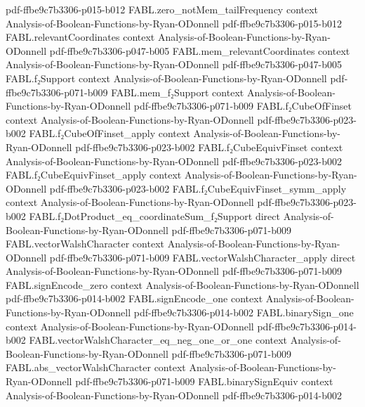 \begin{theorem}
  {pdf-ffbe9c7b3306-p015-b012}
\proofstep
  {FABL.zero_notMem_tailFrequency}
  {context}
  {Analysis-of-Boolean-Functions-by-Ryan-ODonnell}
  {pdf-ffbe9c7b3306-p015-b012}
\proofstep
  {FABL.relevantCoordinates}
  {context}
  {Analysis-of-Boolean-Functions-by-Ryan-ODonnell}
  {pdf-ffbe9c7b3306-p047-b005}
\proofstep
  {FABL.mem_relevantCoordinates}
  {context}
  {Analysis-of-Boolean-Functions-by-Ryan-ODonnell}
  {pdf-ffbe9c7b3306-p047-b005}
\proofstep
  {FABL.f₂Support}
  {context}
  {Analysis-of-Boolean-Functions-by-Ryan-ODonnell}
  {pdf-ffbe9c7b3306-p071-b009}
\proofstep
  {FABL.mem_f₂Support}
  {context}
  {Analysis-of-Boolean-Functions-by-Ryan-ODonnell}
  {pdf-ffbe9c7b3306-p071-b009}
\proofstep
  {FABL.f₂CubeOfFinset}
  {context}
  {Analysis-of-Boolean-Functions-by-Ryan-ODonnell}
  {pdf-ffbe9c7b3306-p023-b002}
\proofstep
  {FABL.f₂CubeOfFinset_apply}
  {context}
  {Analysis-of-Boolean-Functions-by-Ryan-ODonnell}
  {pdf-ffbe9c7b3306-p023-b002}
\proofstep
  {FABL.f₂CubeEquivFinset}
  {context}
  {Analysis-of-Boolean-Functions-by-Ryan-ODonnell}
  {pdf-ffbe9c7b3306-p023-b002}
\proofstep
  {FABL.f₂CubeEquivFinset_apply}
  {context}
  {Analysis-of-Boolean-Functions-by-Ryan-ODonnell}
  {pdf-ffbe9c7b3306-p023-b002}
\proofstep
  {FABL.f₂CubeEquivFinset_symm_apply}
  {context}
  {Analysis-of-Boolean-Functions-by-Ryan-ODonnell}
  {pdf-ffbe9c7b3306-p023-b002}
\proofstep
  {FABL.f₂DotProduct_eq_coordinateSum_f₂Support}
  {direct}
  {Analysis-of-Boolean-Functions-by-Ryan-ODonnell}
  {pdf-ffbe9c7b3306-p071-b009}
\proofstep
  {FABL.vectorWalshCharacter}
  {context}
  {Analysis-of-Boolean-Functions-by-Ryan-ODonnell}
  {pdf-ffbe9c7b3306-p071-b009}
\proofstep
  {FABL.vectorWalshCharacter_apply}
  {direct}
  {Analysis-of-Boolean-Functions-by-Ryan-ODonnell}
  {pdf-ffbe9c7b3306-p071-b009}
\proofstep
  {FABL.signEncode_zero}
  {context}
  {Analysis-of-Boolean-Functions-by-Ryan-ODonnell}
  {pdf-ffbe9c7b3306-p014-b002}
\proofstep
  {FABL.signEncode_one}
  {context}
  {Analysis-of-Boolean-Functions-by-Ryan-ODonnell}
  {pdf-ffbe9c7b3306-p014-b002}
\proofstep
  {FABL.binarySign_one}
  {context}
  {Analysis-of-Boolean-Functions-by-Ryan-ODonnell}
  {pdf-ffbe9c7b3306-p014-b002}
\proofstep
  {FABL.vectorWalshCharacter_eq_neg_one_or_one}
  {context}
  {Analysis-of-Boolean-Functions-by-Ryan-ODonnell}
  {pdf-ffbe9c7b3306-p071-b009}
\proofstep
  {FABL.abs_vectorWalshCharacter}
  {context}
  {Analysis-of-Boolean-Functions-by-Ryan-ODonnell}
  {pdf-ffbe9c7b3306-p071-b009}
\proofstep
  {FABL.binarySignEquiv}
  {context}
  {Analysis-of-Boolean-Functions-by-Ryan-ODonnell}
  {pdf-ffbe9c7b3306-p014-b002}

\end{theorem}
